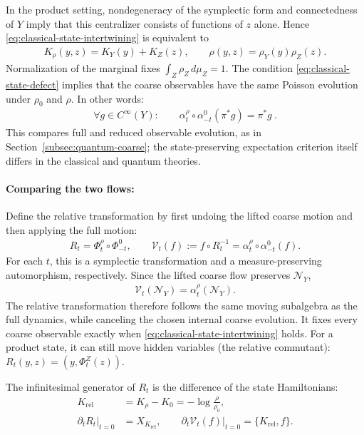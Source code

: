 \documentclass[a4paper,11pt]{article}
\theoremstyle{definition}
\newcommand{\nn}{\nonumber}
\newcommand{\mN}{\mathcal{N}}
\begin{document}
In the product setting, nondegeneracy of the symplectic form and connectedness of $Y$ imply that this centralizer consists of functions of $z$ alone. Hence \eqref{eq:classical-state-intertwining} is equivalent to
\begin{align}\label{eq:classical-product-state-closure}
    K_\rho(y,z)=K_Y(y)+K_Z(z),
    \qquad
    \rho(y,z)=\rho_Y(y)\rho_Z(z).
\end{align}
Normalization of the marginal fixes $\int_Z\rho_Z\,d\mu_Z=1$. The condition \eqref{eq:classical-state-defect} implies that the coarse observables have the same Poisson evolution under $\rho_0$ and $\rho$. In other words:
\begin{align}
    \forall g\in C^\infty(Y):\qquad \alpha^\rho_t\circ\alpha_{-t}^0(\pi^*g)=\pi^*g\ .
\end{align}
This compares full and reduced observable evolution, as in Section~\ref{subsec:quantum-coarse}; the state-preserving expectation criterion itself differs in the classical and quantum theories.

\paragraph{Comparing the two flows:}
Define the relative transformation by first undoing the lifted coarse motion and then applying the full motion:
\begin{align}\label{eq:classical-relative-transformation}
    R_t=\Phi_t^\rho\circ\Phi_{-t}^0,
    \qquad
    \mathcal V_t(f):=f\circ R_t^{-1}
    =\alpha_t^\rho\circ\alpha_{-t}^0(f).
\end{align}
For each $t$, this is a symplectic transformation and a measure-preserving automorphism, respectively. Since the lifted coarse flow preserves $\mN_Y$,
\begin{align}\label{eq:classical-relative-algebra-flow}
    \mathcal V_t(\mN_Y)=\alpha_t^\rho(\mN_Y).
\end{align}
The relative transformation therefore follows the same moving subalgebra as the full dynamics, while canceling the chosen internal coarse evolution. It fixes every coarse observable exactly when \eqref{eq:classical-state-intertwining} holds. For a product state, it can still move hidden variables (the relative commutant): $R_t(y,z)=(y,\Phi_t^Z(z))$.

The infinitesimal generator of $R_t$ is the difference of the state Hamiltonians:
\begin{align}\label{eq:classical-relative-Hamiltonian}
    K_{\mathrm{rel}}&=K_\rho-K_0=-\log\frac{\rho}{\rho_0},\nn\\
    \left.\partial_tR_t\right|_{t=0}&=X_{K_{\mathrm{rel}}},\qquad
    \left.\partial_t\mathcal V_t(f)\right|_{t=0}=\{K_{\mathrm{rel}},f\}.
\end{align}
\end{document}
